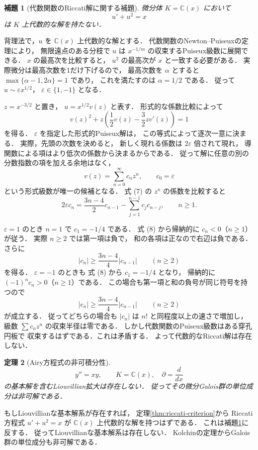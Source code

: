 \documentclass[a5paper,10pt,onecolumn]{jsarticle}
\makeatletter
\theoremstyle{mathnotetheorem}
\newtheorem{theorem}{定理}[section]
\newtheorem{lemma}[theorem]{補題}
\renewcommand{\proofname}{証明}
\renewenvironment{proof}[1][\proofname]{%
  \par\pushQED{\qed}\normalfont\topsep4\p@\@plus2\p@\relax
  \trivlist\item[\hskip\labelsep\bfseries #1]\ignorespaces
}{\popQED\endtrivlist\@endpefalse}
\makeatother
\begin{document}
\begin{lemma}[代数関数のRiccati解に関する補題]
\label{lem:airy-riccati}
微分体 $K=\mathbb C(x)$ において
\[
 u'+u^2=x
 \tag{A-Ric}
\]
は $K$ 上代数的な解を持たない．
\end{lemma}
\begin{proof}
背理法で，$u$ を $\mathbb C(x)$ 上代数的な解とする．
代数関数のNewton--Puiseuxの定理により，
無限遠点のある分枝で $u$ は
$x^{-1/m}$ の収束するPuiseux級数に展開できる．
$x$ の最高次を比較すると，
$u^2$ の最高次が $x$ と一致する必要がある．
実際微分は最高次数を1だけ下げるので，
最高次数を $\alpha$ とすると
$\max\{\alpha-1,2\alpha\}=1$ であり，
これを満たすのは $\alpha=1/2$ である．
従って $u\sim\varepsilon x^{1/2}$，
$\varepsilon\in\{1,-1\}$ となる．

$z=x^{-3/2}$ と置き，
$u=x^{1/2}v(z)$ と表す．
形式的な係数比較によって
\[
 v(z)^2+z\left(\frac12v(z)-\frac32zv'(z)\right)=1
 \tag{7}
\]
を得る．
$\varepsilon$ を指定した形式的Puiseux解は，
この等式によって逐次一意に決まる．
実際，先頭の次数を決めると，
新しく現れる係数は $2\varepsilon$ 倍されて現れ，
導関数による項はより低次の係数から決まるからである．
従って解に任意の別の分数指数の項を加える余地はなく，
\[
 v(z)=\sum_{n=0}^\infty c_nz^n,\qquad c_0=\varepsilon
\]
という形式級数が唯一の候補となる．
式 (7) の $z^n$ の係数を比較すると
\[
 2\varepsilon c_n
 =\frac{3n-4}{2}c_{n-1}
  -\sum_{j=1}^{n-1}c_jc_{n-j},
 \qquad n\ge1.
 \tag{8}
\]

$\varepsilon=1$ のとき
$n=1$ で $c_1=-1/4$ である．
式 (8) から帰納的に $c_n<0$（$n\ge1$）が従う．
実際 $n\ge2$ では第一項は負で，
和の各項は正なので右辺は負である．
さらに
\[
 |c_n|\ge\frac{3n-4}{4}|c_{n-1}|
 \qquad(n\ge2)
\]
を得る．
$\varepsilon=-1$ のときも
式 (8) から $c_1=-1/4$ となり，
帰納的に $(-1)^nc_n>0$（$n\ge1$）である．
この場合も第一項と和の負号が同じ符号を持つので
\[
 |c_n|\ge\frac{3n-4}{4}|c_{n-1}|
 \qquad(n\ge2)
\]
が成立する．
従ってどちらの場合も
$|c_n|$ は $n!$ と同程度以上の速さで増加し，
級数 $\sum c_nz^n$ の収束半径は零である．
しかし代数関数のPuiseux級数はある穿孔円板で
収束するはずである．これは矛盾する．
よって代数的なRiccati解は存在しない．
\end{proof}

\begin{theorem}[Airy方程式の非可積分性]
\label{thm:airy}
\[
 y''=xy,\qquad K=\mathbb C(x),\quad
 \partial=\frac d{dx}
\]
の基本解を含むLiouvillian拡大は存在しない．
従ってその微分Galois群の単位成分は非可解である．
\end{theorem}
\begin{proof}
もしLiouvillianな基本解系が存在すれば，
定理\ref{thm:riccati-criterion}から
Riccati方程式 $u'+u^2=x$ が
$\mathbb C(x)$ 上代数的な解を持つはずである．
これは補題\ref{lem:airy-riccati}に反する．
従ってLiouvillianな基本解系は存在しない．
Kolchinの定理からGalois群の単位成分も非可解である．
\end{proof}
\end{document}
